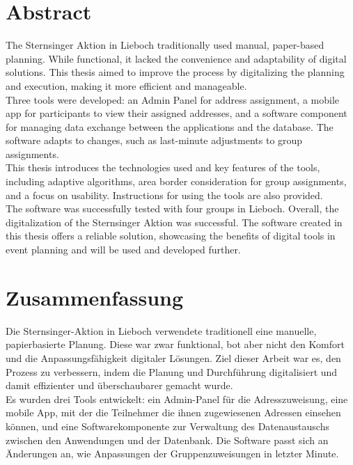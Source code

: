 
\noindent
\setlength{\parindent}{0pt}
\begin{spacing}{1.5}


\section*{Abstract}
The Sternsinger Aktion in Lieboch traditionally used manual, paper-based planning. While functional, it lacked the convenience and adaptability of digital solutions. This thesis aimed to improve the process by digitalizing the planning and execution, making it more efficient and manageable.\\

Three tools were developed: an Admin Panel for address assignment, a mobile app for participants to view their assigned addresses, and a software component for managing data exchange between the applications and the database. The software adapts to changes, such as last-minute adjustments to group assignments.\\

This thesis introduces the technologies used and key features of the tools, including adaptive algorithms, area border consideration for group assignments, and a focus on usability. Instructions for using the tools are also provided.\\

The software was successfully tested with four groups in Lieboch. Overall, the digitalization of the Sternsinger Aktion was successful. The software created in this thesis offers a reliable solution, showcasing the benefits of digital tools in event planning and will be used and developed further.\\

\newpage

\section*{Zusammenfassung}
Die Sternsinger-Aktion in Lieboch verwendete traditionell eine manuelle, papierbasierte Planung. Diese war zwar funktional, bot aber nicht den Komfort und die Anpassungsfähigkeit digitaler Lösungen. Ziel dieser Arbeit war es, den Prozess zu verbessern, indem die Planung und Durchführung digitalisiert und damit effizienter und überschaubarer gemacht wurde.\\

Es wurden drei Tools entwickelt: ein Admin-Panel für die Adresszuweisung, eine mobile App, mit der die Teilnehmer die ihnen zugewiesenen Adressen einsehen können, und eine Softwarekomponente zur Verwaltung des Datenaustauschs zwischen den Anwendungen und der Datenbank. Die Software passt sich an Änderungen an, wie Anpassungen der Gruppenzuweisungen in letzter Minute.\\


\end{spacing}

